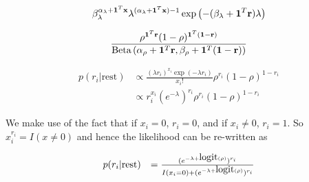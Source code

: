 \documentclass{amsart}
\begin{document}
$$
\beta_{\lambda}^{\alpha_\lambda+{\bf 1}^T{\bf x}} \lambda^{(\alpha_\lambda + {\bf 1}^T{\bf x}) - 1} \exp{\left(-(\beta_\lambda + {\bf1}^T{\bf r}) \lambda \right)}
$$

$$
\frac{\rho^{{\bf 1}^T{\bf r}} (1 - \rho)^{{\bf 1}^T({\bf 1} - {\bf r})}}{{\text{Beta} \left( \alpha_\rho + {\bf 1}^T {\bf r}, \beta_\rho + {\bf 1}^T({\bf 1} - {\bf r}) \right)}}
$$

$$
\begin{array}{ll}
p(r_i | \text{rest}) &\propto \frac{(\lambda r_i)^{x_i} \exp{(-\lambda r_i)}}{x_i !} \rho^{r_i} (1 - \rho)^{1 - r_i} \\
&\propto r_i^{x_i} (e^{-\lambda})^{r_i} \rho^{r_i} (1 - \rho)^{1 - r_i}
\end{array}
$$

We make use of the fact that if $x_i = 0$, $r_i = 0$, and if $x_i \ne 0$,
$r_i = 1$. So $x_i^{r_i} = I(x \ne 0)$ and hence the likelihood can be re-written as

$$
\begin{array}{ll}
p(r_i | \text{rest}) &= \frac{(e^{-\lambda + \mbox{logit}{(\rho)}})^{r_i}}{I(x_i = 0) + (e^{-\lambda + \mbox{logit}{(\rho)}})^{r_i}}
\end{array}
$$


\end{document}
